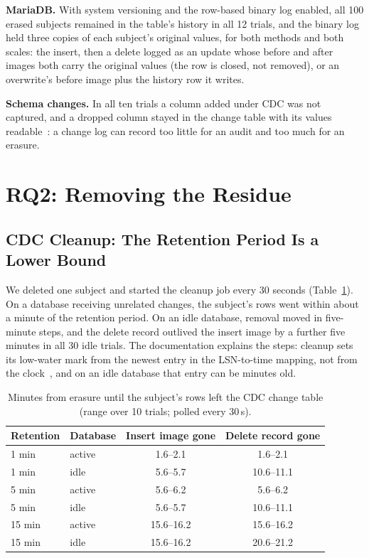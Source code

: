 \documentclass[runningheads]{llncs}
\begin{document}
\textbf{MariaDB.} With system versioning and the row-based binary log enabled,
all 100 erased subjects remained in the table's history in all 12 trials, and
the binary log held three copies of each subject's original values, for both
methods and both scales: the insert, then a delete logged as an update whose before and
after images both carry the original values (the row is closed, not removed),
or an overwrite's before image plus the history row it writes.

\textbf{Schema changes.} In all ten trials a column added under CDC was not
captured, and a dropped column stayed in the change table with its values
readable~\cite{mscdc}: a change log can record too little for an audit and too
much for an erasure.

\section{RQ2: Removing the Residue}\label{sec:rq2}

\subsection{CDC Cleanup: The Retention Period Is a Lower Bound}

We deleted one subject and started the cleanup job every 30 seconds
(Table~\ref{tab:cleanup}). On a database receiving unrelated changes, the
subject's rows went within about a minute of the retention period. On an idle
database, removal moved in five-minute steps, and the delete record outlived the
insert image by a further five minutes in all 30 idle trials. The documentation
explains the steps: cleanup sets its low-water mark from the newest entry in the
LSN-to-time mapping, not from the clock~\cite{mscdc}, and on an idle database
that entry can be minutes old.

\begin{table}[t]
\caption{Minutes from erasure until the subject's rows left the CDC change
table (range over 10 trials; polled every 30\,s).}\label{tab:cleanup}
\centering
\small
\begin{tabular}{llcc}
\toprule
Retention & Database & Insert image gone & Delete record gone \\
\midrule
1 min & active & 1.6--2.1 & 1.6--2.1 \\
1 min & idle & 5.6--5.7 & 10.6--11.1 \\
5 min & active & 5.6--6.2 & 5.6--6.2 \\
5 min & idle & 5.6--5.7 & 10.6--11.1 \\
15 min & active & 15.6--16.2 & 15.6--16.2 \\
15 min & idle & 15.6--16.2 & 20.6--21.2 \\
\bottomrule
\end{tabular}
\end{table}
\end{document}
